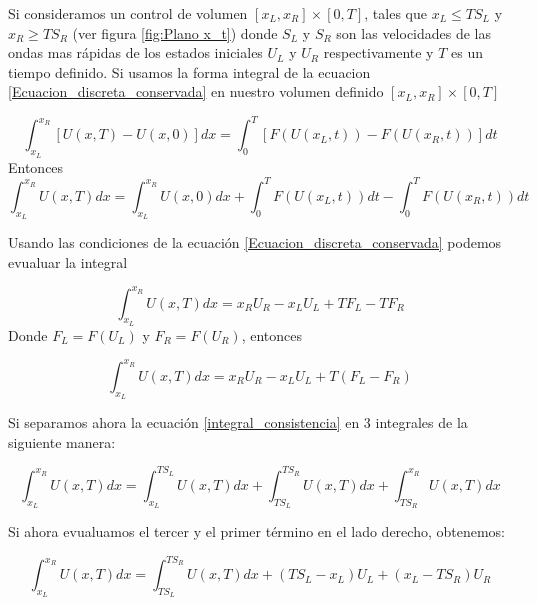 \documentclass[12pt,a4paper]{book}
\begin{document}
Si consideramos un control de volumen $\left[x_L, x_R \right]\times \left[ 0 , T \right]$, tales que $x_L \leq TS_L$ y $x_R \geq TS_R$ (ver figura \ref{fig:Plano x_t}) donde $S_L$ y $S_R$ son las velocidades de las ondas mas rápidas de los estados iniciales $U_L$ y $U_R$ respectivamente y $T$ es un tiempo definido. Si usamos la forma integral de la ecuacion \ref{Ecuacion_discreta_conservada} en nuestro volumen definido $\left[x_L, x_R \right]\times \left[ 0 , T \right]$

\begin{equation*}\label{Forma_integral_conservadas}
\int_{x_L}^{x_R} \left[ U\left( x, T \right) -
 U\left( x, 0 \right) \right] dx = 
 \int_{0}^{T} \left[ F \left(U\left( x_L, t \right) \right) -
 F \left(U\left( x_R, t \right) \right) \right] dt 
\end{equation*}
Entonces
\begin{equation}\label{integral_consistencia}
\int_{x_L}^{x_R} U\left( x, T \right) dx =\int_{x_L}^{x_R} U\left( x, 0 \right) dx+
\int_{0}^{T}  F \left(U\left( x_L, t \right) \right)dt -
\int_{0}^{T}  F \left(U\left( x_R, t \right) \right) dt
\end{equation}

Usando las condiciones de la ecuación \ref{Ecuacion_discreta_conservada} podemos evualuar la integral

\begin{equation*}
\int_{x_L}^{x_R} U\left( x, T \right) dx = 
x_R U_R -x_L U_L+T F_L-T F_R
\end{equation*}
Donde $F_L = F \left( U_L \right)$ y $F_R = F \left( U_R \right)$, entonces

\begin{equation}\label{Condición_de_consistencia}
\int_{x_L}^{x_R} U\left( x, T \right) dx = 
x_R U_R -x_L U_L+T \left( F_L- F_R \right)
\end{equation}

Si separamos ahora la ecuación \ref{integral_consistencia} en 3 integrales de la siguiente manera:

\begin{equation}
\int_{x_L}^{x_R} U\left( x, T \right) dx = 
\int_{x_L}^{T S_L} U \left(x, T \right)dx+
\int_{T S_L}^{T S_R} U \left(x, T \right)dx+
\int_{T S_R}^{x_R} U \left(x, T \right)dx
\end{equation}

Si ahora evualuamos el tercer y el primer término en el lado derecho, obtenemos:

\begin{equation}\label{condicion_consistencia_2}
\int_{x_L}^{x_R} U\left( x, T \right) dx =
\int_{T S_L}^{T S_R} U \left(x, T \right)dx+
\left( T S_L - x_L \right) U_L+
\left( x_L - T S_R \right) U_R
\end{equation}
\end{document}

